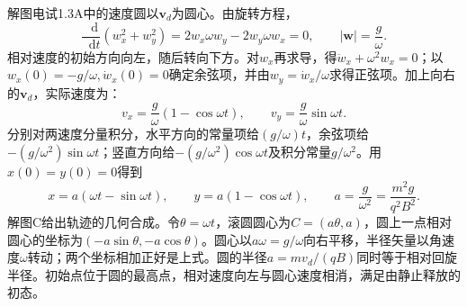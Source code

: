 \documentclass[UTF8,fontset=fandol,a4paper,11pt]{ctexart}
\newcommand{\dd}{\mathop{}\!\mathrm{d}}
\begin{document}
解图电试1.3A中的速度圆以$\boldsymbol v_d$为圆心。由旋转方程，
\[
\frac{\dd}{\dd t}(w_x^2+w_y^2)
=2w_x\omega w_y-2w_y\omega w_x=0,
\qquad |\boldsymbol w|=\frac g\omega.
\]
相对速度的初始方向向左，随后转向下方。对$w_x$再求导，得$\ddot w_x+\omega^2w_x=0$；以$w_x(0)=-g/\omega,\dot w_x(0)=0$确定余弦项，并由$w_y=\dot w_x/\omega$求得正弦项。加上向右的$\boldsymbol v_d$，实际速度为：
\[
\boxed{v_x=\frac g\omega(1-\cos\omega t),\qquad
v_y=\frac g\omega\sin\omega t}.
\]
分别对两速度分量积分，水平方向的常量项给$(g/\omega)t$，余弦项给$-(g/\omega^2)\sin\omega t$；竖直方向给$-(g/\omega^2)\cos\omega t$及积分常量$g/\omega^2$。用$x(0)=y(0)=0$得到
\[
\boxed{x=a(\omega t-\sin\omega t),\qquad
y=a(1-\cos\omega t)},\qquad
a=\frac g{\omega^2}=\frac{m^2g}{q^2B^2}.
\]
解图C给出轨迹的几何合成。令$\theta=\omega t$，滚圆圆心为$C=(a\theta,a)$，圆上一点相对圆心的坐标为$(-a\sin\theta,-a\cos\theta)$。圆心以$a\omega=g/\omega$向右平移，半径矢量以角速度$\omega$转动；两个坐标相加正好是上式。圆的半径$a=m v_d/(qB)$同时等于相对回旋半径。初始点位于圆的最高点，相对速度向左与圆心速度相消，满足由静止释放的初态。
\end{document}
